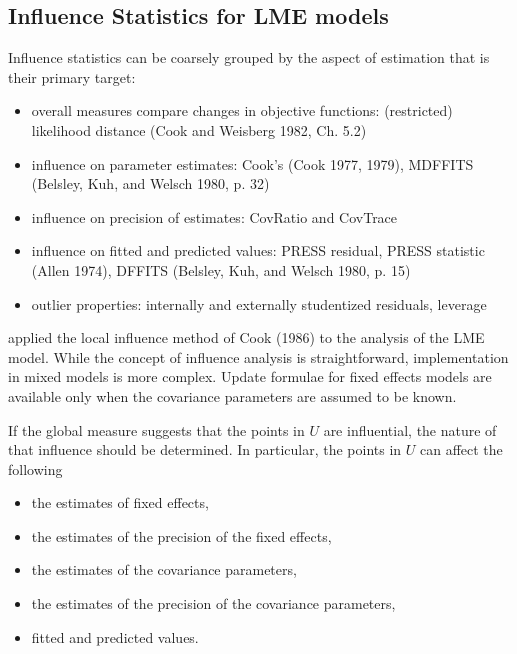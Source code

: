 \documentclass[00-MASTER.tex]{subfiles}
\begin{document}
	\subsection{Influence Statistics for LME models} %
	Influence statistics can be coarsely grouped by the aspect of estimation that is their primary target:
	\begin{itemize}
		\item overall measures compare changes in objective functions: (restricted) likelihood distance (Cook and Weisberg 1982, Ch. 5.2)
		\item influence on parameter estimates: Cook's  (Cook 1977, 1979), MDFFITS (Belsley, Kuh, and Welsch 1980, p. 32)
		\item influence on precision of estimates: CovRatio and CovTrace
		\item influence on fitted and predicted values: PRESS residual, PRESS statistic (Allen 1974), DFFITS (Belsley, Kuh, and Welsch 1980, p. 15)
		\item outlier properties: internally and externally studentized residuals, leverage
	\end{itemize}
	
	\citet{Beckman} applied the local influence method of Cook (1986) to the analysis of the LME model.
	While the concept of influence analysis is straightforward, implementation in mixed models is more complex. Update formulae for fixed effects models are available only when the covariance parameters are assumed to be known.
	
	If the global measure suggests that the points in $U$ are influential, the nature of that influence should be determined. In particular, the points in $U$ can affect the following
	
	\begin{itemize}
		\item the estimates of fixed effects,
		\item the estimates of the precision of the fixed effects,
		\item the estimates of the covariance parameters,
		\item the estimates of the precision of the covariance parameters,
		\item fitted and predicted values.
	\end{itemize}
	\newpage
\end{document}
